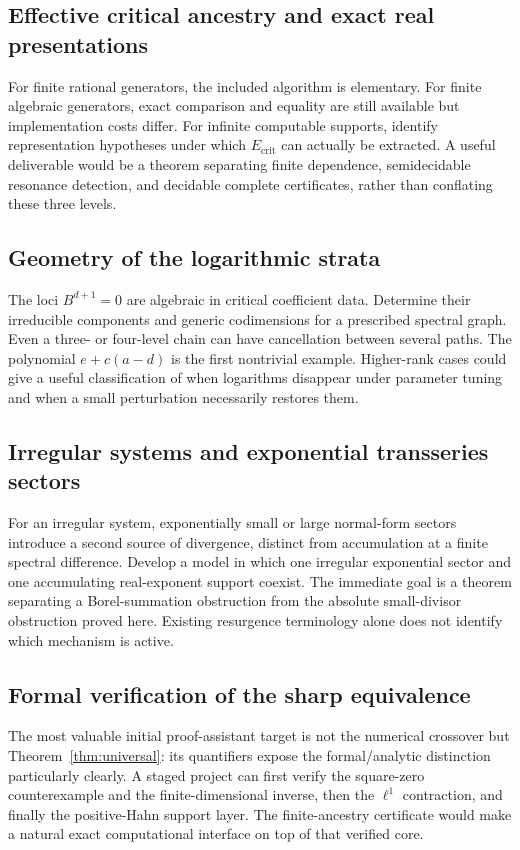 \documentclass[11pt,a4paper]{article}
\numberwithin{equation}{section}
\theoremstyle{definition}
\theoremstyle{remark}
\begin{document}
\subsection{Effective critical ancestry and exact real presentations}
For finite rational generators, the included algorithm is elementary.
For finite algebraic generators, exact comparison and equality are still
available but implementation costs differ. For infinite computable supports,
identify representation hypotheses under which $E_{\mathrm{crit}}$ can
actually be extracted. A useful deliverable would be a theorem separating
finite dependence, semidecidable resonance detection, and decidable complete
certificates, rather than conflating these three levels.

\subsection{Geometry of the logarithmic strata}
The loci $B^{d+1}=0$ are algebraic in critical coefficient data. Determine
their irreducible components and generic codimensions for a prescribed
spectral graph. Even a three- or four-level chain can have cancellation
between several paths. The polynomial $e+c(a-d)$ is the first nontrivial
example. Higher-rank cases could give a useful classification of when
logarithms disappear under parameter tuning and when a small perturbation
necessarily restores them.

\subsection{Irregular systems and exponential transseries sectors}
For an irregular system, exponentially small or large normal-form sectors
introduce a second source of divergence, distinct from accumulation at a
finite spectral difference. Develop a model in which one irregular
exponential sector and one accumulating real-exponent support coexist.
The immediate goal is a theorem separating a Borel-summation obstruction
from the absolute small-divisor obstruction proved here. Existing
resurgence terminology alone does not identify which mechanism is active.

\subsection{Formal verification of the sharp equivalence}
The most valuable initial proof-assistant target is not the numerical
crossover but Theorem~\ref{thm:universal}: its quantifiers expose the
formal/analytic distinction particularly clearly. A staged project can
first verify the square-zero counterexample and the finite-dimensional
inverse, then the $\ell^1$ contraction, and finally the positive-Hahn
support layer. The finite-ancestry certificate would make a natural exact
computational interface on top of that verified core.
\end{document}
